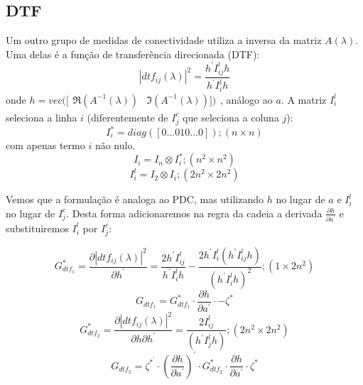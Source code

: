\documentclass[a4paper,10pt]{article}
\begin{document}
\subsection{DTF}

Um outro grupo de medidas de conectividade utiliza a inversa da matriz $A(\lambda)$. Uma delas é a função de transferência direcionada (DTF):
\begin{equation}
 |dtf_{ij}(\lambda)|^{2} = \frac{h^{'} I_{ij}^{l} h}{h^{'} I_{i}^{l} h}
\end{equation}
onde $h = vec([\begin{array}{cc}\Re(A^{-1}(\lambda)) & \Im(A^{-1}(\lambda))])\end{array}$, análogo ao $a$. A matriz $I_{i}^{l}$ seleciona a linha $i$ (diferentemente de $I_{j}^{c}$ que seleciona a coluna $j$):
\begin{equation}
I_{i}^{\ast} = diag([0 \dots 0 1 0 \dots 0]); (n \times n)
\end{equation}
com apenas termo $i$ não nulo.
\begin{equation}
I_{i} = I_{n} \otimes I_{i}^{\ast}; (n^{2} \times n^{2})
\end{equation}
\begin{equation}
I_{i}^{l} = I_{2} \otimes I_{i}; (2n^{2} \times 2n^{2})
\end{equation}

Vemos que a formulação é analoga ao PDC, mas utilizando $h$ no lugar de $a$ e $I_{i}^{l}$ no lugar de $I_{j}^{c}$. Desta forma adicionaremos na regra da cadeia a derivada $\frac{\partial h}{\partial a^{'}}$ e substituiremos $I_{i}^{l}$ por $I_{j}^{c}$:

\begin{equation}
G_{dtf_{1}}^{\ast} = \frac{\partial |dtf_{ij}(\lambda)|^{2}} {\partial h^{'}} = \frac{2 h^{'} I_{ij}^{l}} {h^{'} I_{i}^{l} h} - \frac{2 h^{'} I_{i}^{l} (h^{'} I_{ij}^{l} h)} {(h^{'} I_{i}^{l} h)^{2}}; (1 \times 2n^{2})
\end{equation}
\begin{equation}
G_{dtf_{1}} = G_{dtf_{1}}^{\ast} \cdot \frac{\partial h}{\partial a^{'}} \cdot -\zeta^{\ast} 
\end{equation}
\begin{equation}
G_{dtf_{2}}^{\ast} = \frac{\partial |dtf_{ij}(\lambda)|^{2}} {\partial h \partial h^{'}} = \frac{2 I_{ij}^{l}}{(h^{'} I_{j}^{l} h)}; (2n^{2} \times 2n^{2})
\end{equation}
\begin{equation}
G_{dtf_{2}} = \zeta^{\ast^{'}} \cdot (\frac{\partial h}{\partial a^{'}})^{'} \cdot G_{dtf_{2}}^{\ast} \cdot \frac{\partial h}{\partial a^{'}} \cdot \zeta^{\ast}
\end{equation}
\end{document}
